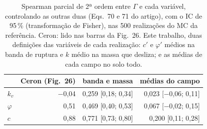 \begin{table}[htbp]\centering\footnotesize
\caption{Spearman parcial de 2ª ordem entre $\Gamma$ e cada variável, controlando as outras duas (Eqs.~70 e 71 do artigo), com o IC de 95\,\% (transformação de Fisher), nas 500 realizações do MC da referência. Ceron: lido nas barras da Fig.~26. Este trabalho, duas definições das variáveis de cada realização: $c'$ e $\varphi'$ médios na banda de ruptura e $k$ médio na massa que desliza; e as médias de cada campo no solo todo.}\label{tab:spearman}
\begin{tabular}{lrrr}\toprule
& Ceron (Fig.~26) & banda e massa & médias do campo \\\midrule
$k_v$ & $-$0{,}04 & 0{,}259 [0{,}18; 0{,}34] & 0{,}023 [$-$0{,}06; 0{,}11] \\
$\varphi$ & 0{,}51 & 0{,}469 [0{,}40; 0{,}53] & 0{,}067 [$-$0{,}02; 0{,}15] \\
$c$ & 0{,}88 & 0{,}771 [0{,}73; 0{,}80] & 0{,}200 [0{,}11; 0{,}28] \\
\bottomrule\end{tabular}\end{table}

